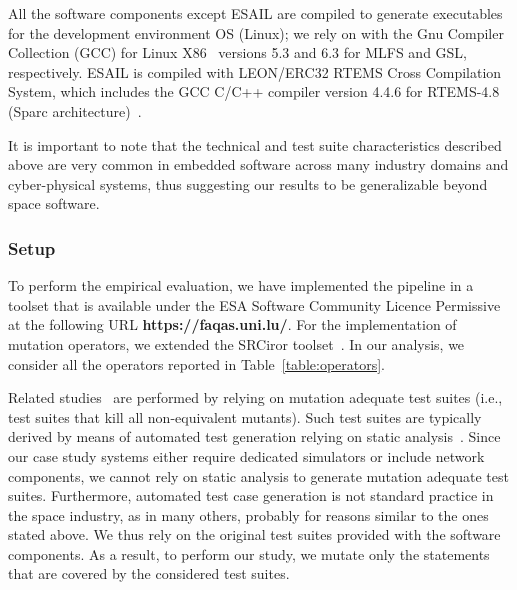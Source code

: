 All the software components except ESAIL are compiled to generate executables for the development environment OS (Linux); we rely on with the Gnu Compiler Collection (GCC)  for Linux X86~\cite{GCC} versions 5.3 and 6.3 for MLFS and GSL, respectively. ESAIL is compiled with 
LEON/ERC32 RTEMS Cross Compilation System, which includes the GCC C/C++ compiler version 4.4.6 for  RTEMS-4.8 (Sparc architecture)~\cite{RTEMS}.

It is important to note that the technical and test suite characteristics described above are very common in embedded software across many industry domains and cyber-physical systems, thus suggesting our results to be generalizable beyond space software. 







\subsubsection{Setup}
\label{experimnt:setup}

To perform the empirical evaluation, we have implemented the \APPR pipeline in a toolset that is available under the ESA Software Community Licence Permissive~\cite{ESAlicence} at the following URL \textbf{https://faqas.uni.lu/}.
For the implementation of mutation operators, we extended the SRCiror toolset~\cite{hariri2018srciror}.
In our analysis, we consider all the operators reported in Table~\ref{table:operators}.

Related studies~\cite{zhang2010operator,zhang2013operator} are performed by relying on mutation adequate test suites (i.e., test suites that kill all non-equivalent mutants). 
Such test suites are typically derived by means of automated test generation relying on static analysis~\cite{papadakis2012mutation}.
Since our case study systems either require dedicated simulators or include network components, we cannot rely on static analysis to generate mutation adequate test suites. 
Furthermore, automated test case generation is not standard practice in the space industry, as in many others, probably for reasons similar to the ones stated above.
We thus rely on the original test suites provided with the software components. As a result, to perform our study, we mutate only the statements that are covered by the considered test suites.

